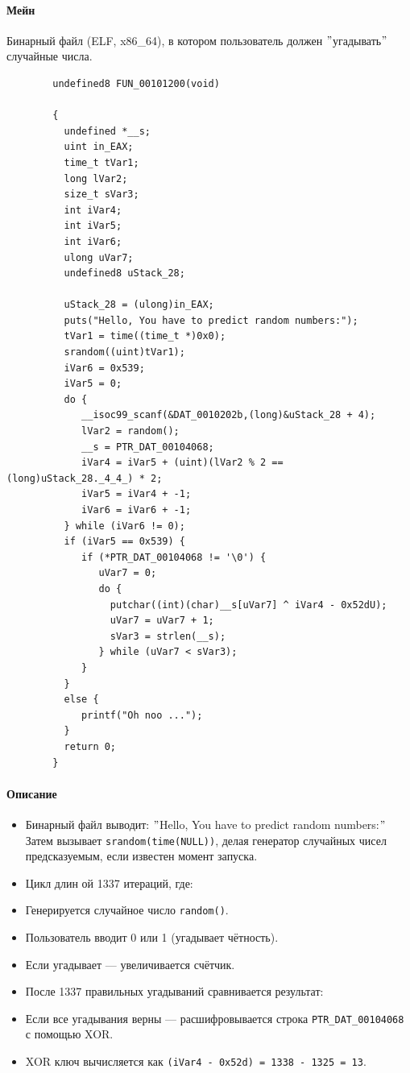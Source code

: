     \paragraph{Мейн}
    Бинарный файл (ELF, x86\_64), в котором пользователь должен \("\)угадывать\("\) случайные числа.
    \begin{verbatim}
        undefined8 FUN_00101200(void)

        {
          undefined *__s;
          uint in_EAX;
          time_t tVar1;
          long lVar2;
          size_t sVar3;
          int iVar4;
          int iVar5;
          int iVar6;
          ulong uVar7;
          undefined8 uStack_28;

          uStack_28 = (ulong)in_EAX;
          puts("Hello, You have to predict random numbers:");
          tVar1 = time((time_t *)0x0);
          srandom((uint)tVar1);
          iVar6 = 0x539;
          iVar5 = 0;
          do {
             __isoc99_scanf(&DAT_0010202b,(long)&uStack_28 + 4);
             lVar2 = random();
             __s = PTR_DAT_00104068;
             iVar4 = iVar5 + (uint)(lVar2 % 2 == (long)uStack_28._4_4_) * 2;
             iVar5 = iVar4 + -1;
             iVar6 = iVar6 + -1;
          } while (iVar6 != 0);
          if (iVar5 == 0x539) {
             if (*PTR_DAT_00104068 != '\0') {
                uVar7 = 0;
                do {
                  putchar((int)(char)__s[uVar7] ^ iVar4 - 0x52dU);
                  uVar7 = uVar7 + 1;
                  sVar3 = strlen(__s);
                } while (uVar7 < sVar3);
             }
          }
          else {
             printf("Oh noo ...");
          }
          return 0;
        }
    \end{verbatim}

    \paragraph{Описание}
    \begin{itemize}
        \item Бинарный файл выводит: \("\)Hello, You have to predict random numbers:\("\)
        Затем вызывает \texttt{srandom(time(NULL))}, делая генератор случайных чисел предсказуемым, если известен момент запуска.

        \item Цикл длин ой 1337 итераций, где:
        \item Генерируется случайное число \texttt{random()}.
        \item Пользователь вводит 0 или 1 (угадывает чётность).
        \item Если угадывает — увеличивается счётчик.
        \item После 1337 правильных угадываний сравнивается результат:
        \item Если все угадывания верны — расшифровывается строка \texttt{PTR\_DAT\_00104068} с помощью XOR.
        \item XOR ключ вычисляется как \texttt{(iVar4 - 0x52d) = 1338 - 1325 = 13}.
    \end{itemize}

